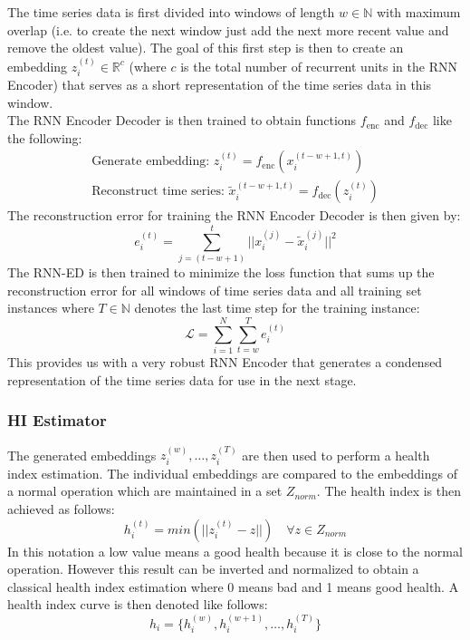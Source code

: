 The time series data is first divided into windows of length $w\in \mathbb{N}$ with maximum overlap (i.e. to create the next window just add the next more recent value and remove the oldest value). The goal of this first step is then to create an embedding $z_i^{(t)} \in \mathbb{R}^c$ (where $c$ is the total number of recurrent units in the RNN Encoder) that serves as a short representation of the time series data in this window.\\
The RNN Encoder Decoder is then trained to obtain functions $f_\text{enc}$ and $f_\text{dec}$ like the following:
\begin{equation}
    \begin{aligned}
        \text{Generate embedding: } z_i^{(t)} = f_\text{enc}(x_i^{(t - w + 1, t)}) \\
        \text{Reconstruct time series: } \widetilde{x}_i^{(t - w + 1, t)} = f_\text{dec}(z_i^{(t)})
    \end{aligned}
\end{equation}
The reconstruction error for training the RNN Encoder Decoder is then given by:
\begin{equation}
    e_i^{(t)} = \sum_{j=(t-w+1)}^t ||x_i^{(j)}-\widetilde{x}_i^{(j)}||^2
\end{equation}
The RNN-ED is then trained to minimize the loss function that sums up the reconstruction error for all windows of time series data and all training set instances where $T\in \mathbb{N}$ denotes the last time step for the training instance:
\begin{equation}
    \mathcal{L} = \sum_{i=1}^N \sum_{t=w}^T e_i^{(t)}
\end{equation}
This provides us with a very robust RNN Encoder that generates a condensed representation of the time series data for use in the next stage.

\subsubsection*{HI Estimator}
\label{sec:rul_estimation:approaches:embed_rul:hi_estimator}

The generated embeddings $z_i^{(w)}, \ldots, z_i^{(T)}$ are then used to perform a health index estimation. The individual embeddings are compared to the embeddings of a normal operation which are maintained in a set $Z_{norm}$. The health index is then achieved as follows:
\begin{equation}
    h_i^{(t)} = min(||z_i^{(t)} - z||) \quad \forall z \in Z_{norm}
\end{equation}
In this notation a low value means a good health because it is close to the normal operation. However this result can be inverted and normalized to obtain a classical health index estimation where 0 means bad and 1 means good health. A health index curve is then denoted like follows:
\begin{equation}
    h_i = \{h_i^{(w)}, h_i^{(w+1)}, \ldots, h_i^{(T)}\}
\end{equation}

